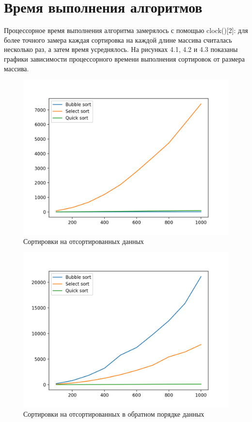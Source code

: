 \documentclass{report}
\begin{document}
\section{Время выполнения алгоритмов}
Процессорное время выполнения алгоритма замерялось с помощью clock()[2]: для более точного замера каждая сортировка на каждой длине массива считалась несколько раз, а затем время усреднялось. 
На рисунках 4.1, 4.2 и 4.3 показаны графики зависимости процессорного времени выполнения сортировок от размера массива.

\begin{figure}[h!p]
	\centering
	\includegraphics[scale = 0.8]{dir.png}
	\caption{Сортировки на отсортированных данных}
	\label{fig:mpr}
\end{figure}

\begin{figure}[h!p]
	\centering
	\includegraphics[scale = 0.8]{undir.png}
	\caption{Сортировки на отсортированных в обратном порядке данных}
	\label{fig:mpr}
\end{figure}
\end{document}
